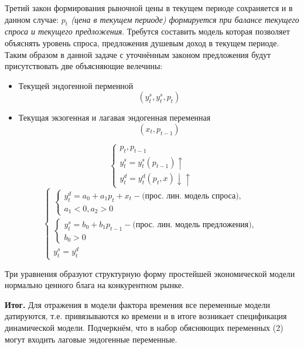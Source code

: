 \documentclass[12pt,a4paper]{article}
\begin{document}
Третий закон формирования рыночной цены в текущем периоде сохраняется и в данном случае:\textit{ $p_t$ (цена в текущем периоде) формируется при балансе текущего спроса и текущего предложения}. Требутся составить модель которая позволяет объяснять уровень спроса, предложения душевым доход в текущем периоде. Таким образом в данной задаче с уточнённым законом предложения будут присутствовать две объясняющие велечины:
\begin{itemize}
\item Текущей эндогенной перменной 
\begin{equation}
(y_t^s, y_t^s, p_t)
\end{equation}
\item Текущая экзогенная и лагавая эндогенная переменная
\begin{equation}
(x_t, p_{t - 1})
\end{equation}
\end{itemize}
\begin{equation*}
\begin{cases}
p_t, p_{t-1} \\
y_t^s = y_t^s(p_{t-1})\uparrow \\
y_t^d = y_t^d(p_t, x)\downarrow \uparrow
\end{cases}
\end{equation*}
\begin{equation}
\begin{cases}
\begin{cases}
y_t^d = a_0 + a_1 p_t + x_t - \text{(прос. лин. модель спроса)}, \\
a_1 < 0, a_2 > 0
\end{cases} \\
\begin{cases}
y_t^s = b_0 + b_1 p_{t - 1} - \text{(прос. лин. модель предложения)}, \\
b_0 > 0
\end{cases} \\
y_t^s = y_t^d
\end{cases}
\end{equation}

Три уравнения образуют структурную форму простейшей экономической модели нормально ценного блага на конкурентном рынке.

\textbf{Итог.} Для отражения в модели фактора времения все переменные модели датируются, т.е. привязываются ко времени и в итоге возникает спецификация динамической модели. Подчеркнём, что в набор обясняющих переменных (2) могут входить лаговые эндогенные переменные.
\end{document}
